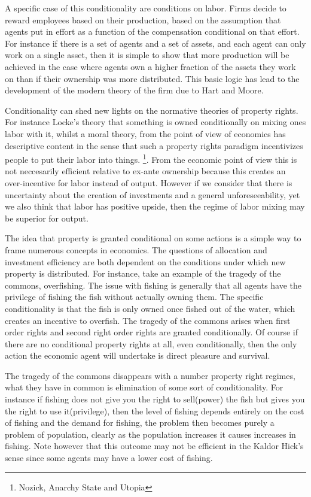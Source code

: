\documentclass[12pt]{article}
\numberwithin{equation}{section}
\begin{document}
A specific case of this conditionality are conditions on labor. Firms decide to reward employees based on their production, based on the assumption that agents put in effort as a function of the compensation conditional on that effort. For instance if there is a set of agents and a set of assets, and each agent can only work on a single asset, then it is simple to show that more production will be achieved in the case where agents own a higher fraction of the assets they work on than if their ownership was more distributed. This basic logic has lead to the development of the modern theory of the firm due to Hart and Moore. 

Conditionality can shed new lights on the normative theories of property rights. For instance Locke's theory that something is owned conditionally on mixing ones labor with it, whilst a moral theory, from the point of view of economics has descriptive content in the sense that such a property rights paradigm incentivizes people to put their labor into things. \footnote{Nozick, Anarchy State and Utopia}. From the economic point of view this is not neccesarily efficient relative to ex-ante ownership because this creates an over-incentive for labor instead of output. However if we consider that there is uncertainty about the creation of investments and a general unforeseeability, yet we also think that labor has positive upside, then the regime of labor mixing may be superior for output. 

The idea that property is granted conditional on some actions is a simple way to frame numerous concepts in economics. The questions of allocation and investment efficiency are both dependent on the conditions under which new property is distributed. For instance, take an example of the tragedy of the commons, overfishing. The issue with fishing is generally that all agents have the privilege of fishing the fish without actually owning them. The specific conditionality is that the fish is only owned once fished out of the water, which creates an incentive to overfish. The tragedy of the commons arises when first order rights and second right order rights are granted conditionally. Of course if there are no conditional property rights at all, even conditionally, then the only action the economic agent will undertake is direct pleasure and survival. 

The tragedy of the commons disappears with a number property right regimes, what they have in common is elimination of some sort of conditionality. For instance if fishing does not give you the right to sell(power) the fish but gives you the right to use it(privilege), then the level of fishing depends entirely on the cost of fishing and the demand for fishing, the problem then becomes purely a problem of population, clearly as the population increases it causes increases in fishing. Note however that this outcome may not be efficient in the Kaldor Hick's sense since some agents may have a lower cost of fishing. 
\end{document}
